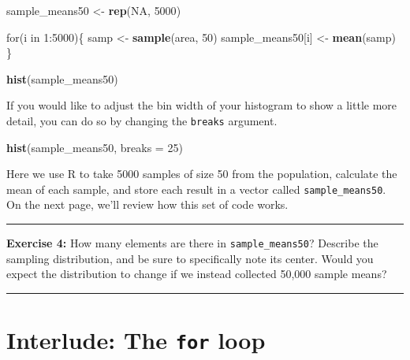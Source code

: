 \documentclass[]{book}
\newenvironment{Shaded}{\begin{snugshade}}{\end{snugshade}}
\newcommand{\KeywordTok}[1]{\textcolor[rgb]{0.13,0.29,0.53}{\textbf{{#1}}}}
\newcommand{\DataTypeTok}[1]{\textcolor[rgb]{0.13,0.29,0.53}{{#1}}}
\newcommand{\DecValTok}[1]{\textcolor[rgb]{0.00,0.00,0.81}{{#1}}}
\newcommand{\StringTok}[1]{\textcolor[rgb]{0.31,0.60,0.02}{{#1}}}
\newcommand{\OtherTok}[1]{\textcolor[rgb]{0.56,0.35,0.01}{{#1}}}
\newcommand{\NormalTok}[1]{{#1}}
\theoremstyle{definition}
\theoremstyle{definition}
\theoremstyle{definition}
\theoremstyle{remark}
\begin{document}
\begin{Shaded}
\begin{Highlighting}[]
\NormalTok{sample_means50 <-}\StringTok{ }\KeywordTok{rep}\NormalTok{(}\OtherTok{NA}\NormalTok{, }\DecValTok{5000}\NormalTok{)}

\NormalTok{for(i in }\DecValTok{1}\NormalTok{:}\DecValTok{5000}\NormalTok{)\{}
   \NormalTok{samp <-}\StringTok{ }\KeywordTok{sample}\NormalTok{(area, }\DecValTok{50}\NormalTok{)}
   \NormalTok{sample_means50[i] <-}\StringTok{ }\KeywordTok{mean}\NormalTok{(samp)}
   \NormalTok{\}}

\KeywordTok{hist}\NormalTok{(sample_means50)}
\end{Highlighting}
\end{Shaded}

If you would like to adjust the bin width of your histogram to show a
little more detail, you can do so by changing the \texttt{breaks}
argument.

\begin{Shaded}
\begin{Highlighting}[]
\KeywordTok{hist}\NormalTok{(sample_means50, }\DataTypeTok{breaks =} \DecValTok{25}\NormalTok{)}
\end{Highlighting}
\end{Shaded}

Here we use R to take 5000 samples of size 50 from the population,
calculate the mean of each sample, and store each result in a vector
called \texttt{sample\_means50}. On the next page, we'll review how this
set of code works.

\begin{center}\rule{0.5\linewidth}{\linethickness}\end{center}

\textbf{Exercise 4:} How many elements are there in
\texttt{sample\_means50}? Describe the sampling distribution, and be
sure to specifically note its center. Would you expect the distribution
to change if we instead collected 50,000 sample means?

\begin{center}\rule{0.5\linewidth}{\linethickness}\end{center}

\section{\texorpdfstring{Interlude: The \texttt{for}
loop}{Interlude: The for loop}}\label{interlude-the-for-loop}
\end{document}
